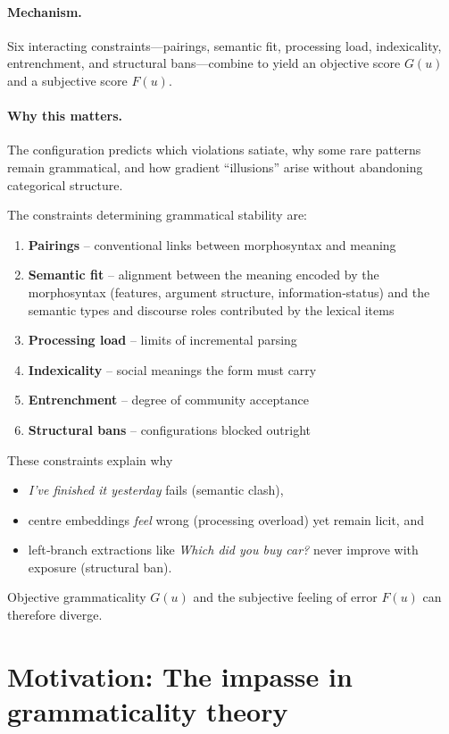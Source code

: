 \documentclass[12pt]{article}
\begin{document}
\paragraph*{Mechanism.}%
Six interacting constraints—pairings, semantic fit, processing load, indexicality, entrenchment, and structural bans—combine to yield an objective score \(G(u)\) and a subjective score \(F(u)\).

\paragraph*{Why this matters.}%
The configuration predicts which violations satiate, why some rare patterns remain grammatical, and how gradient “illusions” arise without abandoning categorical structure.

\bigskip
The constraints determining grammatical stability are:

\begin{enumerate}
\item \textbf{Pairings} – conventional links between morphosyntax and meaning
\item \textbf{Semantic fit} – alignment between the meaning encoded by the morphosyntax (features, argument structure, information‐status) and the semantic types and discourse roles contributed by the lexical items
\item \textbf{Processing load} – limits of incremental parsing
\item \textbf{Indexicality} – social meanings the form must carry
\item \textbf{Entrenchment} – degree of community acceptance
\item \textbf{Structural bans} – configurations blocked outright
\end{enumerate}

These constraints explain why
\begin{itemize}
    \item \textit{I've finished it yesterday} fails (semantic clash),  
    \item centre embeddings \emph{feel} wrong (processing overload) yet remain licit, and
    \item left‑branch extractions like \textit{Which did you buy car?} never improve with exposure (structural ban).
\end{itemize}
Objective grammaticality \(G(u)\) and the subjective feeling of error \(F(u)\) can therefore diverge.


\section{Motivation: The impasse in grammaticality theory}
\end{document}
